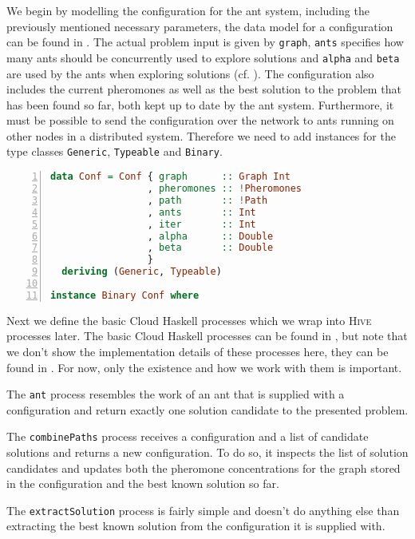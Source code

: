 We begin by modelling the configuration for the ant system, including the previously mentioned necessary parameters, the data model for a configuration can be found in . The actual problem input is given by \texttt{graph}, \texttt{ants} specifies how many ants should be concurrently used to explore solutions and \texttt{alpha} and \texttt{beta} are used by the ants when exploring solutions (cf. ). The configuration also includes the current pheromones as well as the best solution to the problem that has been found so far, both kept up to date by the ant system. Furthermore, it must be possible to send the configuration over the network to ants running on other nodes in a distributed system. Therefore we need to add instances for the type classes \texttt{Generic}, \texttt{Typeable} and \texttt{Binary}.

\begin{lstlisting}[language=Haskell,frame=tb,numbers=left,label=lst:ant_conf,caption=Configuration for the ant system.]
data Conf = Conf { graph      :: Graph Int
                 , pheromones :: !Pheromones
                 , path       :: !Path
                 , ants       :: Int
                 , iter       :: Int
                 , alpha      :: Double
                 , beta       :: Double
                 }
  deriving (Generic, Typeable)

instance Binary Conf where
\end{lstlisting}

Next we define the basic \textsf{Cloud Haskell} processes which we wrap into \textsc{Hive} processes later. The basic \textsf{Cloud Haskell} processes can be found in , but note that we don't show the implementation details of these processes here, they can be found in . For now, only the existence and how we work with them is important.

The \texttt{ant} process resembles the work of an ant that is supplied with a configuration and return exactly one solution candidate to the presented problem.

The \texttt{combinePaths} process receives a configuration and a list of candidate solutions and returns a new configuration. To do so, it inspects the list of solution candidates and updates both the pheromone concentrations for the graph stored in the configuration and the best known solution so far.

The \texttt{extractSolution} process is fairly simple and doesn't do anything else than extracting the best known solution from the configuration it is supplied with.

